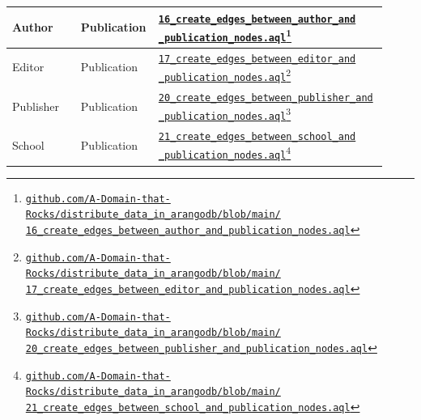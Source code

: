 \begin{center}
\begin{longtable}{p{0.18875\linewidth}p{0.20275\linewidth}p{0.52350\linewidth}}
		Author & Publication & \href{https://github.com/A-Domain-that-Rocks/distribute_data_in_arangodb/blob/main/16_create_edges_between_author_and_publication_nodes.aql}{\texttt{16\_create\_edges\_between\_author\_and\newline\_publication\_nodes.aql}}\footnote{\href{https://github.com/A-Domain-that-Rocks/distribute\_data\_in\_arangodb/blob/main/16\_create\_edges\_between\_author\_and\_publication\_nodes.aql}{\texttt{github.com/A-Domain-that-Rocks/distribute\_data\_in\_arangodb/blob/main/\newline16\_create\_edges\_between\_author\_and\_publication\_nodes.aql}}}\\
		\hline
		Editor & Publication & \href{https://github.com/A-Domain-that-Rocks/distribute_data_in_arangodb/blob/main/17_create_edges_between_editor_and_publication_nodes.aql}{\texttt{17\_create\_edges\_between\_editor\_and\newline\_publication\_nodes.aql}}\footnote{\href{https://github.com/A-Domain-that-Rocks/distribute\_data\_in\_arangodb/blob/main/17\_create\_edges\_between\_editor\_and\_publication\_nodes.aql}{\texttt{github.com/A-Domain-that-Rocks/distribute\_data\_in\_arangodb/blob/main/\newline17\_create\_edges\_between\_editor\_and\_publication\_nodes.aql}}}\\
		\hline
		Publisher & Publication & \href{https://github.com/A-Domain-that-Rocks/distribute_data_in_arangodb/blob/main/20_create_edges_between_publisher_and_publication_nodes.aql}{\texttt{20\_create\_edges\_between\_publisher\_and\newline\_publication\_nodes.aql}}\footnote{\href{https://github.com/A-Domain-that-Rocks/distribute\_data\_in\_arangodb/blob/main/20\_create\_edges\_between\_publisher\_and\_publication\_nodes.aql}{\texttt{github.com/A-Domain-that-Rocks/distribute\_data\_in\_arangodb/blob/main/\newline20\_create\_edges\_between\_publisher\_and\_publication\_nodes.aql}}}\\
		\hline
		School & Publication & \href{https://github.com/A-Domain-that-Rocks/distribute_data_in_arangodb/blob/main/21_create_edges_between_school_and_publication_nodes.aql}{\texttt{21\_create\_edges\_between\_school\_and\newline\_publication\_nodes.aql}}\footnote{\href{https://github.com/A-Domain-that-Rocks/distribute\_data\_in\_arangodb/blob/main/21\_create\_edges\_between\_school\_and\_publication\_nodes.aql}{\texttt{github.com/A-Domain-that-Rocks/distribute\_data\_in\_arangodb/blob/main/\newline21\_create\_edges\_between\_school\_and\_publication\_nodes.aql}}}\\

\end{longtable}
\end{center}

